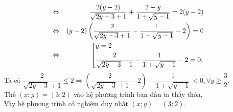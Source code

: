 \begin{ex}
{\begin{enumerate}
\begin{eqnarray*}
		& \Leftrightarrow&\dfrac{2(y-2)}{\sqrt{2y-3}+1}+\dfrac{2-y}{1+\sqrt{y-1}}=2(y-2)\\
		& \Leftrightarrow & (y-2)\left(\dfrac{2}{\sqrt{2y-3}+1}-\dfrac{1}{1+\sqrt{y-1}}-2\right)=0\\
		& \Leftrightarrow & \left[\begin{aligned}&y=2\\&\dfrac{2}{\sqrt{2y-3}+1}-\dfrac{1}{1+\sqrt{y-1}}-2=0.\end{aligned}\right.
	\end{eqnarray*}
	Ta có $\dfrac{2}{\sqrt{2y-3}+1}\le 2 \Rightarrow\left(\dfrac{2}{\sqrt{2y-3}+1}-2 \right) -\dfrac{1}{1+\sqrt{y-1}}<0, \forall y\ge \dfrac{3}{2}$.\\
	Thế $ (x;y)=(3;2) $ vào hệ phương trình ban đầu ta thấy thỏa. \\
	Vậy hệ phương trình có nghiệm duy nhất $ (x;y)=(3;2) $.
\end{enumerate}
}
\end{ex}


